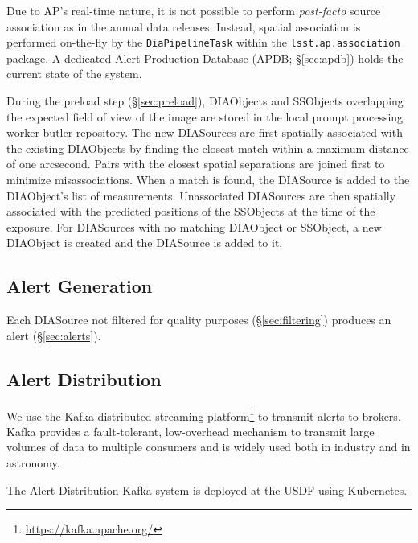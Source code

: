 Due to AP's real-time nature, it is not possible to perform \textit{post-facto} source association as in the annual data releases.
Instead, spatial association is performed on-the-fly by the \texttt{DiaPipelineTask} within the \texttt{lsst.ap.association} package.
A dedicated Alert Production Database (APDB; \S \ref{sec:apdb}) holds the current state of the system.

During the preload step (\S \ref{sec:preload}), DIAObjects and SSObjects overlapping the expected field of view of the image are stored in the local prompt processing worker butler repository.
The new DIASources are first spatially associated with the existing DIAObjects by finding the closest match within a maximum distance of one arcsecond.
Pairs with the closest spatial separations are joined first to minimize misassociations.
When a match is found, the DIASource is added to the DIAObject's list of measurements.
Unassociated DIASources are then spatially associated with the predicted positions of the SSObjects at the time of the exposure.
For DIASources with no matching DIAObject or SSObject, a new DIAObject is created and the DIASource is added to it.




\subsection{Alert Generation}

Each DIASource not filtered for quality purposes (\S \ref{sec:filtering}) produces an alert (\S \ref{sec:alerts}).


\subsection{Alert Distribution} \label{sec:alertdist}

We use the Kafka distributed streaming platform\footnote{\url{https://kafka.apache.org/}} to transmit alerts to brokers.
Kafka provides a fault-tolerant, low-overhead mechanism to transmit large volumes of data to multiple consumers and is widely used both in industry and in astronomy. 

The Alert Distribution Kafka system is deployed at the USDF using Kubernetes.

